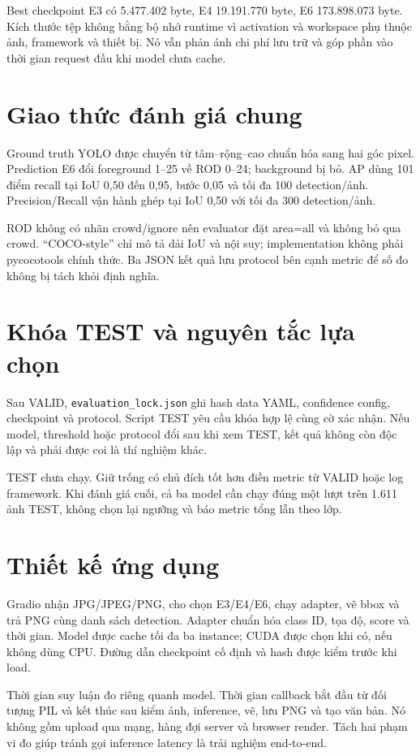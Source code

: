 Best checkpoint E3 có 5.477.402 byte, E4 19.191.770 byte, E6 173.898.073 byte. Kích thước tệp không bằng bộ nhớ runtime vì activation và workspace phụ thuộc ảnh, framework và thiết bị. Nó vẫn phản ánh chi phí lưu trữ và góp phần vào thời gian request đầu khi model chưa cache.

\section{Giao thức đánh giá chung}
Ground truth YOLO được chuyển từ tâm--rộng--cao chuẩn hóa sang hai góc pixel. Prediction E6 đổi foreground 1--25 về ROD 0--24; background bị bỏ. AP dùng 101 điểm recall tại IoU 0,50 đến 0,95, bước 0,05 và tối đa 100 detection/ảnh. Precision/Recall vận hành ghép tại IoU 0,50 với tối đa 300 detection/ảnh.

ROD không có nhãn crowd/ignore nên evaluator đặt area=all và không bỏ qua crowd. “COCO-style” chỉ mô tả dải IoU và nội suy; implementation không phải pycocotools chính thức. Ba JSON kết quả lưu protocol bên cạnh metric để số đo không bị tách khỏi định nghĩa.

\section{Khóa TEST và nguyên tắc lựa chọn}
Sau VALID, \texttt{evaluation\_lock.json} ghi hash data YAML, confidence config, checkpoint và protocol. Script TEST yêu cầu khóa hợp lệ cùng cờ xác nhận. Nếu model, threshold hoặc protocol đổi sau khi xem TEST, kết quả không còn độc lập và phải được coi là thí nghiệm khác.

TEST chưa chạy. Giữ trống có chủ đích tốt hơn điền metric từ VALID hoặc log framework. Khi đánh giá cuối, cả ba model cần chạy đúng một lượt trên 1.611 ảnh TEST, không chọn lại ngưỡng và báo metric tổng lẫn theo lớp.

\section{Thiết kế ứng dụng}
Gradio nhận JPG/JPEG/PNG, cho chọn E3/E4/E6, chạy adapter, vẽ bbox và trả PNG cùng danh sách detection. Adapter chuẩn hóa class ID, tọa độ, score và thời gian. Model được cache tối đa ba instance; CUDA được chọn khi có, nếu không dùng CPU. Đường dẫn checkpoint cố định và hash được kiểm trước khi load.

Thời gian suy luận đo riêng quanh model. Thời gian callback bắt đầu từ đối tượng PIL và kết thúc sau kiểm ảnh, inference, vẽ, lưu PNG và tạo văn bản. Nó không gồm upload qua mạng, hàng đợi server và browser render. Tách hai phạm vi đo giúp tránh gọi inference latency là trải nghiệm end-to-end.
